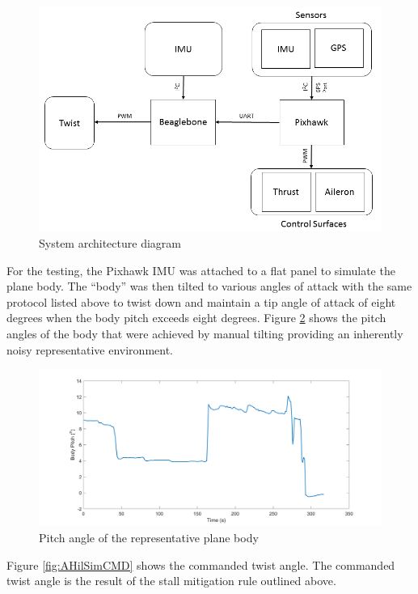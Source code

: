 \documentclass[11pt]{ucthesis}
\begin{document}
\begin{figure}[h]
\centering
\includegraphics[width=1\linewidth]{Figures/HardwareConfiguration5_14_2016.png}
\caption{System architecture diagram}
\label{fig:AsysArch}
\end{figure}

For the testing, the Pixhawk IMU was attached to a flat panel to simulate the plane body. The “body” was then tilted to various angles of attack with the same protocol listed above to twist down and maintain a tip angle of attack of eight degrees when the body pitch exceeds eight degrees. Figure \ref{fig:AHilSimBPitch} shows the pitch angles of the body that were achieved by manual tilting providing an inherently noisy representative environment. 

\begin{figure}[thpb]
\centering
\includegraphics[width=1\linewidth]{Figures/BodyPitch.png}
\caption{Pitch angle of the representative plane body}
\label{fig:AHilSimBPitch}
\end{figure}

Figure \ref{fig:AHilSimCMD} shows the commanded twist angle. The commanded twist angle is the result of the stall mitigation rule outlined above.
\end{document}
